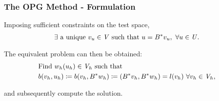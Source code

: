 \begin{frame}
\frametitle{The OPG Method - Formulation}

Imposing sufficient constraints on the test space,
\begin{align}
  \exists\ \text{a unique}\ v_u \in \mathit{{{V}}}\ \text{such that}\ u = B^*v_u,\ \forall u \in \mathit{{{U}}}.
\end{align}

The equivalent problem can then be obtained:
\begin{align}
& \text{Find}\ w_h(u_h) \in \mathit{{{V}}}_h\ \text{such that}\\
& b(v_h,u_h) \coloneqq b(v_h,B^*w_h) \coloneqq (B^*v_h,B^*w_h) = l(v_h)\ \forall v_h \in \mathit{{{V}}}_h,
\end{align}

and subsequently compute the solution.

\end{frame}
